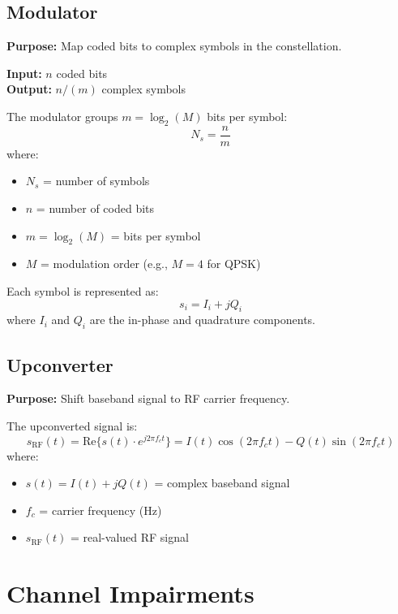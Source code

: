 \subsection{Modulator}

\textbf{Purpose:} Map coded bits to complex symbols in the constellation.

\textbf{Input:} $n$ coded bits\\
\textbf{Output:} $n/(m)$ complex symbols

The modulator groups $m = \log_2(M)$ bits per symbol:
\begin{equation}
N_s = \frac{n}{m}
\end{equation}
where:
\begin{itemize}
\item $N_s$ = number of symbols
\item $n$ = number of coded bits
\item $m = \log_2(M)$ = bits per symbol
\item $M$ = modulation order (e.g., $M=4$ for QPSK)
\end{itemize}

Each symbol is represented as:
\begin{equation}
s_i = I_i + jQ_i
\end{equation}
where $I_i$ and $Q_i$ are the in-phase and quadrature components.

\subsection{Upconverter}

\textbf{Purpose:} Shift baseband signal to RF carrier frequency.

The upconverted signal is:
\begin{equation}
s_{\mathrm{RF}}(t) = \mathrm{Re}\{s(t) \cdot e^{j2\pi f_c t}\} = I(t)\cos(2\pi f_c t) - Q(t)\sin(2\pi f_c t)
\end{equation}
where:
\begin{itemize}
\item $s(t) = I(t) + jQ(t)$ = complex baseband signal
\item $f_c$ = carrier frequency (Hz)
\item $s_{\mathrm{RF}}(t)$ = real-valued RF signal
\end{itemize}

\section{Channel Impairments}

